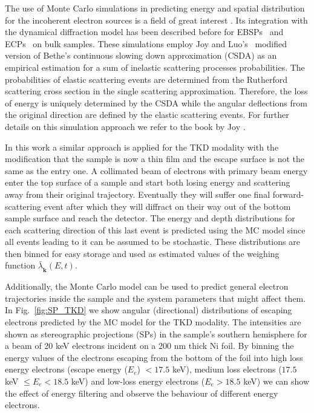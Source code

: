 The use of Monte Carlo simulations in predicting energy and spatial distribution for the incoherent electron sources is a field of great interest \cite{Ren98, Tao04}. Its integration with the dynamical diffraction model has been described before for EBSPs~\cite{degraef2013e} and ECPs~\cite{degraef2017k} on bulk samples. These simulations employ Joy and Luo's~\cite{joy1989} modified version of Bethe's continuous slowing down approximation (CSDA) as an empirical estimation for a sum of inelastic scattering processes probabilities. The probabilities of elastic scattering events are determined from the Rutherford scattering cross section in the single scattering approximation. Therefore, the loss of energy is uniquely determined by the CSDA while the angular deflections from the original direction are defined by the elastic scattering events. For further details on this simulation approach we refer to the book by Joy \cite{joy1995a}. 

In this work a similar approach is applied for the TKD modality with the modification that the sample is now a thin film and the escape surface is not the same as the entry one. A collimated beam of electrons with primary beam energy enter the top surface of a sample and start both losing energy and scattering away from their original trajectory. Eventually they will suffer one final forward-scattering event after which they will diffract on their way out of the bottom sample surface and reach the detector. The energy and depth distributions for each scattering direction of this last event is predicted using the MC model since all events leading to it can be assumed to be stochastic. These distributions are then binned for easy storage and used as estimated values of the weighing function $\bar{\lambda}_{\hat{\mathbf{k}}}(E,t)$.


Additionally, the Monte Carlo model can be used to predict general electron trajectories inside the sample and the system parameters that might affect them. In Fig.~\ref{fig:SP_TKD} we show angular (directional) distributions of escaping electrons predicted by the MC model for the TKD modality. The intensities are shown as stereographic projections (SPs) in the sample's southern hemisphere for a beam of 20 keV electrons incident on a 200 nm thick Ni foil. By binning the energy values of the electrons escaping from the bottom of the foil into high loss energy electrons (escape energy ($E_e$) $<17.5$ keV), medium loss electrons ($17.5$ keV $\leqslant E_e < 18.5$ keV) and low-loss energy electrons ($E_e>18.5$ keV) we can show the effect of energy filtering and observe the behaviour of different energy electrons. 



